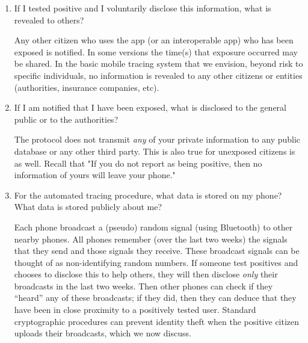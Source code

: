 \documentclass{article}
\newcommand{\TODO}[1]{ {\color{blue} #1 }}
\begin{document}
\begin{enumerate}[leftmargin=*]
\item If I tested positive and I voluntarily disclose this information, what is revealed to others?

Any other citizen who uses the app (or an interoperable app) who has been exposed is notified. In some versions the time(s) that exposure occurred may be shared.  In the basic mobile tracing system that we envision, beyond risk to specific individuals, no information is revealed to any other citizens or entities (authorities, insurance companies, etc). 

\item If I am notified that I have been exposed, what is disclosed to the general public or to the authorities? 
 
The protocol does not transmit \emph{any} of your private information to any public database or any other third party. This is also true for unexposed citizens is as well. Recall that "If you do not report as being positive, then no information of yours will leave your phone."

\item For the automated tracing procedure, what data is stored on my phone? What data is stored publicly about me?

Each phone broadcast a (pseudo) random signal (using Bluetooth) to other nearby phones. All phones remember (over the last two weeks) the signals that they send and those signals they receive. These broadcast signals can be thought of as non-identifying random numbers. 
If someone test positives and chooses to disclose this to help others, they will then disclose \emph{only} their broadcasts in the last two weeks. Then other phones can check if they ``heard'' any of these broadcasts; if they did, then they can deduce that they have been in close proximity to a positively tested user.  Standard cryptographic procedures can prevent identity theft when the positive citizen uploads their broadcasts, which we now discuss.

\iffalse
\item Is any of my location information ever broadcast to the world?

No location information ever leaves your phone in the mobile-tracing protocol.  This one advantage of this particular Bluetooth beaconing based approach.   One could design GPS-centric approaches to mobile-tracing. Here, all individuals geo-location information would have to leave their phones; the approach would have to heavily rely on secure cryptography for privacy.
\fi

\end{enumerate}
\end{document}
